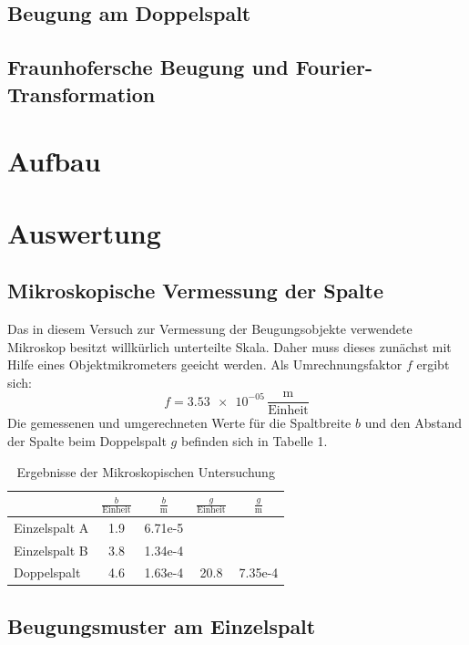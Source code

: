 \documentclass[11pt,ngerman,a4paper]{article}
\begin{document}
\subsection{Beugung am Doppelspalt}
\subsection{Fraunhofersche Beugung und Fourier-Transformation}
\section{Aufbau}
\section{Auswertung}
\subsection{Mikroskopische Vermessung der Spalte}
Das in diesem Versuch zur Vermessung der Beugungsobjekte verwendete Mikroskop besitzt willkürlich unterteilte Skala. Daher muss dieses zunächst mit Hilfe eines Objektmikrometers geeicht werden. Als Umrechnungsfaktor $f$ ergibt sich:
\[
f = \num{3.53e-05}\,\frac{\si{\meter}}{\mathrm{Einheit}}
\]
Die gemessenen und umgerechneten Werte für die Spaltbreite $b$ und den Abstand der Spalte beim Doppelspalt $g$ befinden sich in Tabelle 1.
\begin{table}[h]
\centering
\begin{tabular}{lSSSS}

\toprule
&$\frac{b}{\mathrm{Einheit}}$ & $\frac{b}{\si{\meter}}$ & $\frac{g}{\mathrm{Einheit}}$ &$\frac{g}{\si{\meter}}$\\
\midrule
Einzelspalt A & 1.9  &6.71e-5 & &\\
Einzelspalt B & 3.8  &1.34e-4 &&\\
Doppelspalt   & 4.6  & 1.63e-4&20.8&7.35e-4\\
\bottomrule
\end{tabular}
\caption{Ergebnisse der Mikroskopischen Untersuchung}
\end{table}


\subsection{Beugungsmuster am Einzelspalt}
\end{document}
